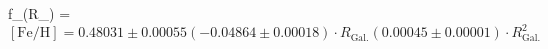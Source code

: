 f_(R_) = $\mathrm{[Fe/H]} = 0.48031 \pm 0.00055 (-0.04864 \pm 0.00018) \cdot R_\mathrm{Gal.} (0.00045 \pm 0.00001) \cdot R_\mathrm{Gal.}^2$%
